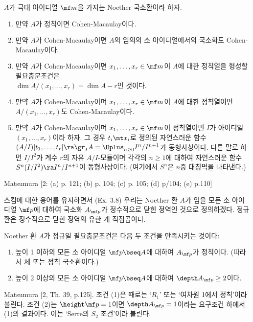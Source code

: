 	
	\begin{theorema}
	$A$가 극대 아이디얼 $\mf m$을 가지는 Noether 국소환이라 하자.
	\begin{enumerate}[label=(\alph*)]
	\item 만약 $A$가 정칙이면 Cohen-Macaulay이다.
	\item 만약 $A$가 Cohen-Macaulay이면 $A$의 임의의 소 아이디얼에서의 국소화도 Cohen-Macaulay이다.
	\item 만약 $A$가 Cohen-Macaulay이면 $x_1,\ldots,x_r\in\mf m$이 $A$에 대한 정칙열을 형성할 필요충분조건은\\
	$\dim A/(x_1,\ldots,x_r)=\dim A-r$인 것이다.
	\item 만약 $A$가 Cohen-Macaulay이며 $x_1,\ldots,x_r\in\mf m$이 $A$에 대한 정칙열이면
	$A/(x_1,\ldots,x_r)$도 Cohen-Macaulay이다.
	\item 만약 $A$가 Cohen-Macaulay이며 $x_1,\ldots,x_r\in\mf m$이 정칙열이면 $I$가 아이디얼 $(x_1,\ldots,x_r)$이라 하자.
	그 경우 $t_i\mt x_i$로 정의된 자연스러운 함수 $(A/I)[t_1,\ldots,t_r]\ra\gr_IA=\Oplus_{n\ge 0}I^n/I^{n+1}$가 동형사상이다.
	다른 말로 하면 $I/I^2$가 계수 $r$의 자유 $A/I$-모듈이며 각각의 $n\ge 1$에 대하여 자연스러운 함수
	$S^n(I/I^2)\ra I^n/I^{n+1}$이 동형사상이다. (여기에서 $S^n$은 $n$중 대칭멱을 나타낸다.)\\
	\end{enumerate}
	\pf Matsumura [2: (a) p. 121; (b) p. 104; (c) p. 105; (d) p/104; (e) p.110]
	\end{theorema}
	
	스킴에 대한 용어를 유지하면서 (Ex. 3.8) 우리는 Noether 환 $A$가 임을
	모든 소 아이디얼 $\mf p$에 대하여 국소화 $A_{\mf p}$가 정수적으로 닫힌 정역인 것으로 정의하겠다.
	정규환은 정수적으로 닫힌 정역의 유한 개 직접곱이다.
	
	
	\begin{theorema}[Serre]
	Noether 환 $A$가 정규일 필요충분조건은 다음 두 조건을 만족시키는 것이다:\\
	\begin{enumerate}[label=(\arabic*)]
	\item 높이 1 이하의 모든 소 아이디얼 $\mf p\bseq A$에 대하여 $A_{\mf p}$가 정칙이다. (따라서 체 또는 정칙 국소환이다.)
	\item 높이 2 이상의 모든 소 아이디얼 $\mf p\bseq A$에 대하여 $\depth A_{\mf p}\ge 2$이다.\\
	\end{enumerate}
	\pf Matsumura [2, Th. 39, p.125]. 조건 (1)은 때로는 `$R_1$' 또는 `여차원 1에서 정칙'이라 불린다.
	조건 (2)는 $\height\mf p=1$이면 $\depth A_{\mf p}=1$이라는 요구조건 하에서 (1)의 결과이다.
	이는 `Serre의 $S_2$ 조건'이라 불린다.
	\end{theorema}
	
